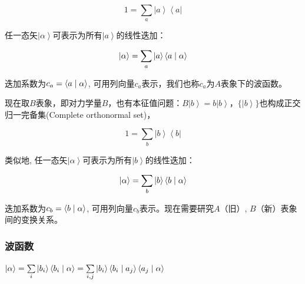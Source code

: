 \begin{equation*}
1 = \sum\limits_a {\left| a \right\rangle \left\langle a \right|} 
\end{equation*}

任一态矢$\left| \alpha \right\rangle$可表示为所有$\left| a
\right\rangle$的线性迭加：

\begin{equation*}
\left| \alpha  \right\rangle  = \sum\limits_a {\left| a
\right\rangle \left\langle {a}
 \mathrel{\left | {\vphantom {a \alpha }}
 \right. \kern-\nulldelimiterspace}
 {\alpha } \right\rangle } 
\end{equation*}


迭加系数为$c_a  = \left\langle {a}
 \mathrel{\left | {\vphantom {a \alpha }}
 \right. \kern-\nulldelimiterspace}
 {\alpha } \right\rangle $, 可用列向量$c_a$表示，我们也称$c_a$为$A$表象下的波函数。

现在取$B$表象，即对力学量$B$，也有本征值问题：$B \left| b
\right\rangle = b \left| b \right\rangle $，$\{ \left| b
\right\rangle \}$也构成正交归一完备集(Complete orthonormal set)，


\begin{equation*}
1 = \sum\limits_b {\left| b \right\rangle \left\langle b \right|} 
\end{equation*}

类似地, 任一态矢$\left| \alpha \right\rangle$可表示为所有$\left| b
\right\rangle$的线性迭加：

\begin{equation*}
\left| \alpha  \right\rangle  = \sum\limits_b {\left| b
\right\rangle \left\langle {b}
 \mathrel{\left | {\vphantom {b \alpha }}
 \right. \kern-\nulldelimiterspace}
 {\alpha } \right\rangle } 
\end{equation*}

迭加系数为$c_b  = \left\langle {b}
 \mathrel{\left | {\vphantom {b \alpha }}
 \right. \kern-\nulldelimiterspace}
 {\alpha } \right\rangle$, 可用列向量$c_b$表示。现在需要研究$A$（旧）, $B$（新）表象间的变换关系。

\subsubsection{波函数}

$\left| \alpha  \right\rangle  = \sum\limits_i {\left| {b_i }
\right\rangle \left\langle {{b_i }}
 \mathrel{\left | {\vphantom {{b_i } \alpha }}
 \right. \kern-\nulldelimiterspace}
 {\alpha } \right\rangle }  = \sum\limits_{i,j} {\left| {b_i } \right\rangle \left\langle {{b_i }}
 \mathrel{\left | {\vphantom {{b_i } {a_j }}}
 \right. \kern-\nulldelimiterspace}
 {{a_j }} \right\rangle \left\langle {{a_j }}
 \mathrel{\left | {\vphantom {{a_j } \alpha }}
 \right. \kern-\nulldelimiterspace}
 {\alpha } \right\rangle } $

